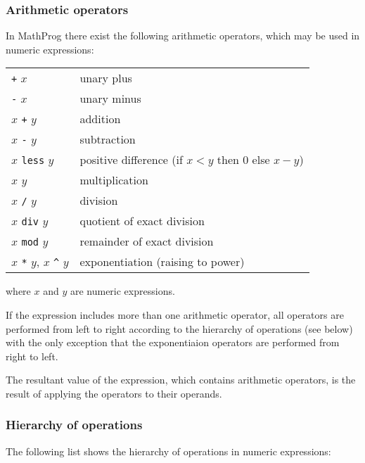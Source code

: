 \documentclass[10pt]{article}
\begin{document}
\subsubsection{Arithmetic operators}

In MathProg there exist the following arithmetic operators, which may
be used in numeric expressions:

\medskip

\begin{tabular}{@{}p{96pt}p{222pt}@{}}
{\tt +} $x$&unary plus\\
{\tt -} $x$&unary minus\\
$x$ {\tt +} $y$&addition\\
$x$ {\tt -} $y$&subtraction\\
$x$ {\tt less} $y$&positive difference (if $x<y$ then 0 else $x-y$)\\
$x$ {\tt *} $y$&multiplication\\
$x$ {\tt /} $y$&division\\
$x$ {\tt div} $y$&quotient of exact division\\
$x$ {\tt mod} $y$&remainder of exact division\\
$x$ {\tt **} $y$, $x$ {\tt\textasciicircum} $y$&exponentiation (raising
to power)\\
\end{tabular}

\medskip

\noindent where $x$ and $y$ are numeric expressions.

If the expression includes more than one arithmetic operator, all
operators are performed from left to right according to the hierarchy
of operations (see below) with the only exception that the
exponentiaion operators are performed from right to left.

The resultant value of the expression, which contains arithmetic
operators, is the result of applying the operators to their operands.

\subsubsection{Hierarchy of operations}
\label{hierarchy}

The following list shows the hierarchy of operations in numeric
expressions:

\medskip
\end{document}
